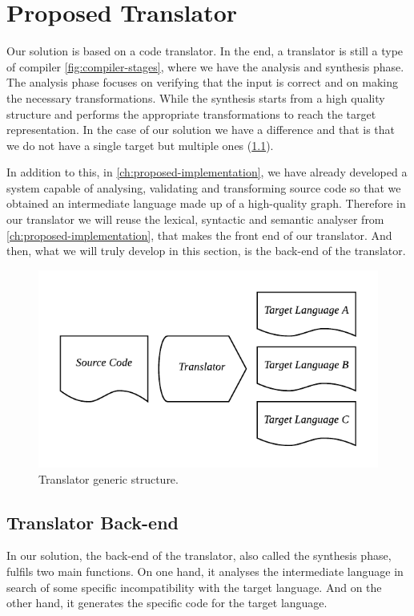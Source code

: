 \chapter{Proposed Translator}
\label{ch:proposed-system}

Our solution is based on a code translator. In the end, a translator is still a type of compiler \cref{fig:compiler-stages},
where we have the analysis and synthesis phase. The analysis phase focuses on verifying that the input is correct and on
making the necessary transformations. While the synthesis starts from a high quality structure and performs the
appropriate transformations to reach the target representation. In the case of our solution we have a difference
and that is that we do not have a single target but multiple ones (\cref{fig:translator}).

In addition to this, in \cref{ch:proposed-implementation}, we have already developed a system capable of analysing,
validating and transforming source code so that we obtained an intermediate language made up of a
high-quality graph. Therefore in our translator we will reuse the lexical, syntactic and semantic
analyser from \cref{ch:proposed-implementation}, that makes the front end of our translator.
And then, what we will truly develop in this section, is the back-end of the translator.

\begin{figure}
    \includegraphics{images/translator.pdf}
    \centering
	\caption[Translator generic structure]{Translator generic structure.}
    \label{fig:translator}
\end{figure}

\section{Translator Back-end}
In our solution, the back-end of the translator, also called the synthesis phase,
fulfils two main functions. On one hand, it analyses the intermediate language
in search of some specific incompatibility with the target language. And on the
other hand, it generates the specific code for the target language.

